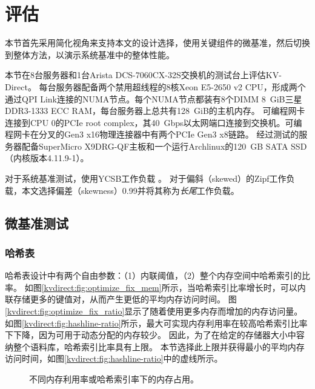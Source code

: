 \section{评估}
\label{kvdirect:sec:eval}


\label{kvdirect:sec:evaluation}
本节首先采用简化视角来支持本文的设计选择，使用关键组件的微基准，然后切换到整体方法，以演示系统基准中\oursys {}的整体性能。


本节在8台服务器和1台Arista DCS-7060CX-32S交换机的测试台上评估KV-Direct。
每台服务器配备两个禁用超线程的8核Xeon E5-2650 v2 CPU，形成两个通过QPI Link连接的NUMA节点。每个NUMA节点都装有8个DIMM 8~GiB三星DDR3-1333 ECC RAM，每台服务器上总共有128~GiB的主机内存。
可编程网卡~ \cite {caulfield2016cloud}连接到CPU 0的PCIe root complex，其40~Gbps以太网端口连接到交换机。可编程网卡在分叉的Gen3 x16物理连接器中有两个PCIe Gen3 x8链路。
经过测试的服务器配备SuperMicro X9DRG-QF主板和一个运行Archlinux的120~GB SATA SSD（内核版本4.11.9-1）。

对于系统基准测试，使用YCSB工作负载 \cite {cooper2010benchmarking}。
对于偏斜（skewed）的Zipf工作负载，本文选择偏差（skewness）0.99并将其称为\textit {长尾}工作负载。

\subsection{微基准测试}
\label{kvdirect:sec:microbenchmarks}



\subsubsection{哈希表}
\label{kvdirect:sec:hashtable-eval}

哈希表设计中有两个自由参数：（1）内联阈值，（2）整个内存空间中哈希索引的比率。
如图\ref {kvdirect:fig:optimize_fix_mem}所示，当哈希索引比率增长时，可以内联存储更多的键值对，从而产生更低的平均内存访问时间。
图\ref {kvdirect:fig:optimize_fix_ratio}显示了随着使用更多内存而增加的内存访问量。
如图\ref {kvdirect:fig:hashline-ratio}所示，最大可实现内存利用率在较高哈希索引比率下下降，因为可用于动态分配的内存较少。
因此，为了在给定的存储器大小中容纳整个语料库，哈希索引比率具有上限。
本节选择此上限并获得最小的平均内存访问时间，如图\ref {kvdirect:fig:hashline-ratio}中的虚线所示。


\begin{figure}[t]
	\caption{不同内存利用率或哈希索引率下的内存占用。}
	\label{kvdirect:fig:memory-access-count}
\end{figure}

